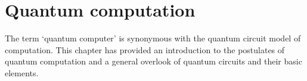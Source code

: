 \chapter{Quantum computation}
The term `quantum computer' is synonymous with the quantum circuit model of computation. This chapter has provided an introduction to the postulates of quantum computation and a general overlook of quantum circuits and their basic elements.


